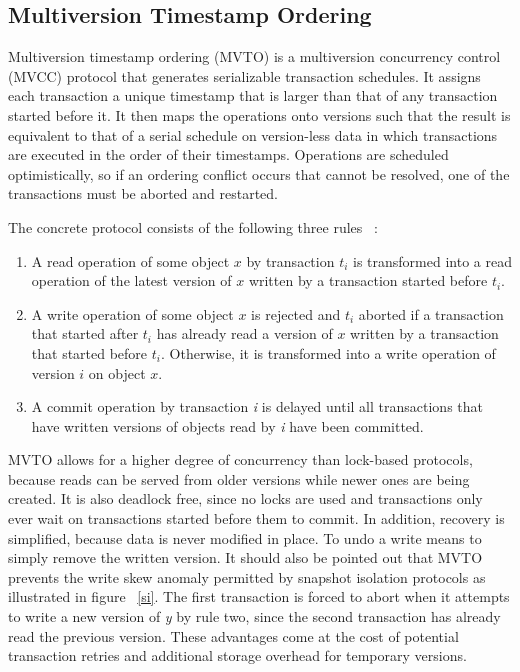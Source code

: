 \documentclass[10pt,final,journal]{IEEEtran}
\begin{document}
\subsection{Multiversion Timestamp Ordering}
Multiversion timestamp ordering (MVTO) is a multiversion concurrency control (MVCC) protocol that generates serializable transaction schedules. It assigns each transaction a unique timestamp that is larger than that of any transaction started before it. It then maps the operations onto versions such that the result is equivalent to that of a serial schedule on version-less data in which transactions are executed in the order of their timestamps. Operations are scheduled optimistically, so if an ordering conflict occurs that cannot be resolved, one of the transactions must be aborted and restarted.

The concrete protocol consists of the following three rules ~\cite{Weikum:2001:TIS}:
\begin{enumerate}
\item A read operation of some object $x$ by transaction $t_i$ is transformed into a read operation of the latest version of $x$ written by a transaction started before $t_i$.
\item A write operation of some object $x$ is rejected and $t_i$ aborted if a transaction that started after $t_i$ has already read a version of $x$ written by a transaction that started before $t_i$. Otherwise, it is transformed into a write operation of version $i$ on object $x$.
\item A commit operation by transaction \emph{i} is delayed until all transactions that have written versions of objects read by \emph{i} have been committed.
\end{enumerate}

MVTO allows for a higher degree of concurrency than lock-based protocols, because reads can be served from older versions while newer ones are being created. It is also deadlock free, since no locks are used and transactions only ever wait on transactions started before them to commit. In addition, recovery is simplified, because data is never modified in place. To undo a write means to simply remove the written version. It should also be pointed out that MVTO prevents the write skew anomaly permitted by snapshot isolation protocols as illustrated in figure ~\ref{si}. The first transaction is forced to abort when it attempts to write a new version of \emph{y} by rule two, since the second transaction has already read the previous version. These advantages come at the cost of potential transaction retries and additional storage overhead for temporary versions.
\end{document}
